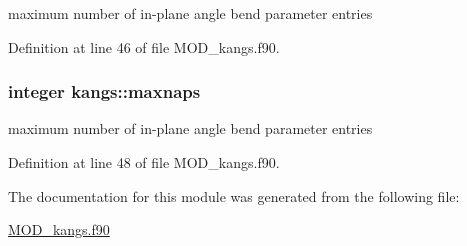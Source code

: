 maximum number of in-\/plane angle bend parameter entries 



Definition at line 46 of file M\-O\-D\-\_\-kangs.\-f90.

\hypertarget{classkangs_a6646c9ed34bc273addaebe53e7ece288}{
\subsubsection[{maxnaps}]{\setlength{\rightskip}{0pt plus 5cm}integer kangs\-::maxnaps}}\label{classkangs_a6646c9ed34bc273addaebe53e7ece288}


maximum number of in-\/plane angle bend parameter entries 



Definition at line 48 of file M\-O\-D\-\_\-kangs.\-f90.



The documentation for this module was generated from the following file\-:\begin{DoxyCompactItemize}
\item 
\hyperlink{MOD__kangs_8f90}{M\-O\-D\-\_\-kangs.\-f90}\end{DoxyCompactItemize}
